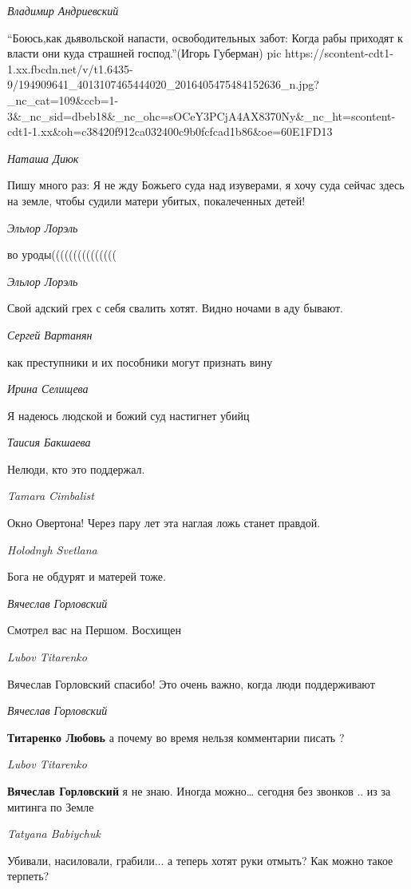 \emph{Владимир Андриевский}

\enquote{Боюсь,как дьявольской напасти, освободительных забот: Когда рабы приходят к власти они куда страшней господ.}(Игорь Губерман)
\ifcmt
  pic https://scontent-cdt1-1.xx.fbcdn.net/v/t1.6435-9/194909641_4013107465444020_2016405475484152636_n.jpg?_nc_cat=109&ccb=1-3&_nc_sid=dbeb18&_nc_ohc=sOCeY3PCjA4AX8370Ny&_nc_ht=scontent-cdt1-1.xx&oh=c38420f912ca032400c9b0fcfcad1b86&oe=60E1FD13
\fi

\emph{Наташа Диюк}

Пишу много раз: Я не жду Божьего суда над изуверами, я хочу суда сейчас здесь
на земле, чтобы судили матери убитых, покалеченных детей!

\emph{Эльлор Лорэль}

во уроды(((((((((((((((

\emph{Эльлор Лорэль}

Свой адский грех с себя свалить хотят. Видно ночами в аду бывают.

\emph{Сергей Вартанян}

как преступники и их пособники могут признать вину

\emph{Ирина Селищева}

Я надеюсь людской и божий суд настигнет убийц

\emph{Таисия Бакшаева}

Нелюди, кто это поддержал.

\emph{Tamara Cimbalist}

Окно Овертона! Через пару лет эта наглая ложь станет правдой.

\emph{Holodnyh Svetlana}

Бога не обдурят и матерей тоже.

\emph{Вячеслав Горловский}

Смотрел вас на Першом. Восхищен

\emph{Lubov Titarenko}

Вячеслав Горловский спасибо! Это очень важно, когда люди поддерживают

\emph{Вячеслав Горловский}

\textbf{Титаренко Любовь} а почему во время нельзя комментарии писать ?

\emph{Lubov Titarenko}

\textbf{Вячеслав Горловский} я не знаю. Иногда можно… сегодня без звонков .. из
за митинга по Земле

\emph{Tatyana Babiychuk}

Убивали, насиловали, грабили... а теперь хотят руки отмыть? Как можно такое терпеть?

